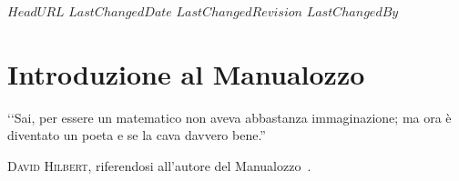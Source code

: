 \svnidlong
{$HeadURL$}
{$LastChangedDate$}
{$LastChangedRevision$}
{$LastChangedBy$}

\chapter*{Introduzione al Manualozzo\texttrademark\ }

\begin{introduction}
‘‘Sai, per essere un matematico non aveva abbastanza immaginazione; ma ora è diventato un poeta e se la cava davvero bene.''
\begin{flushright}
	\textsc{David Hilbert,} riferendosi  all'autore del Manualozzo\texttrademark\ .
\end{flushright}
\end{introduction}
